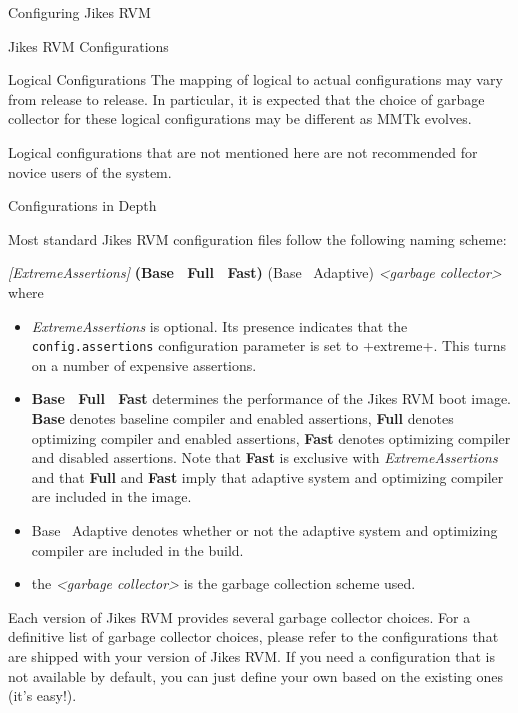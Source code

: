 \begin{section}{Configuring Jikes RVM}
\begin{subsection}{Jikes RVM Configurations}
\begin{subsubsection}{Logical Configurations}
The mapping of logical to actual configurations may vary from release to release. In particular, it is expected that the choice of garbage collector for these logical configurations may be different as MMTk evolves.

Logical configurations that are not mentioned here are not recommended for novice users of the system.

\end{subsubsection}

\begin{subsubsection}{Configurations in Depth}

Most standard Jikes RVM configuration files follow the following naming scheme:

\textit{[ExtremeAssertions]} \textbf{(Base \textbar\ Full \textbar\ Fast)} (Base \textbar\ Adaptive) \textit{\textless garbage collector\textgreater }
where
\begin{itemize}
  \item \textit{ExtremeAssertions} is optional. Its presence indicates that the \texttt{con\-fig.as\-ser\-tions} configuration parameter is set to \spverb+extreme+. This turns on a number of expensive assertions.
  \item \textbf{Base \textbar\ Full \textbar\ Fast} determines the performance of the Jikes RVM boot image. \textbf{Base} denotes baseline compiler and enabled assertions, \textbf{Full} denotes optimizing compiler and enabled assertions, \textbf{Fast} denotes optimizing compiler and disabled assertions. Note that \textbf{Fast} is exclusive with \textit{ExtremeAssertions} and that \textbf{Full} and \textbf{Fast} imply that adaptive system and optimizing compiler are included in the image.
  \item Base \textbar\ Adaptive denotes whether or not the adaptive system and optimizing compiler are included in the build.
  \item the \textit{\textless garbage collector\textgreater} is the garbage collection scheme used.
\end{itemize}

Each version of Jikes RVM provides several garbage collector choices. For a definitive list of garbage collector choices, please refer to the configurations that are shipped with your version of Jikes RVM. If you need a configuration that is not available by default, you can just define your own based on the existing ones (it's easy!).


\end{subsubsection}
\end{subsection}
\end{section}
